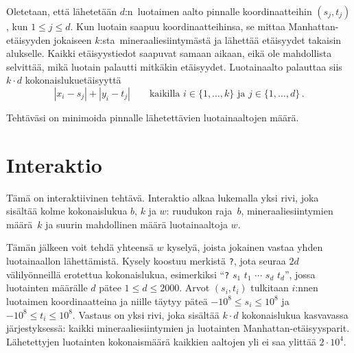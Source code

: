 Oletetaan, että lähetetään $d$:n~luotaimen aalto pinnalle koordinaatteihin $(s_j, t_j)$, kun $1\leq j\leq d$.
Kun luotain saapuu koordinaatteihinsa, se mittaa Manhattan-etäisyyden jokaiseen $k$:sta~mineraaliesiintymästä ja lähettää etäisyydet takaisin alukselle.
Kaikki etäisyystiedot saapuvat samaan aikaan, eikä ole mahdollista selvittää, mikä luotain palautti mitkäkin etäisyydet.
Luotainaalto palauttaa siis $k \cdot d$ kokonaislukuetäisyyttä
\[|x_i-s_j| + |y_i - t_j| \qquad\text{kaikilla } i \in \{1,\ldots,k\} \text{ ja } j \in\{ 1,\ldots,d\}\,.\]

Tehtäväsi on minimoida pinnalle lähetettävien luotainaaltojen määrä.

\section*{Interaktio}

Tämä on interaktiivinen tehtävä.
Interaktio alkaa lukemalla yksi rivi, joka sisältää kolme kokonaislukua $b$, $k$ ja $w$:
ruudukon raja~$b$,
mineraaliesiintymien määrä~$k$
ja suurin mahdollinen määrä luotainaaltoja $w$.

Tämän jälkeen voit tehdä yhteensä $w$ kyselyä, joista jokainen vastaa yhden luotainaallon lähettämistä.
Kysely koostuu merkistä \texttt{?}, jota seuraa $2d$ välilyönneillä erotettua kokonaislukua,
esimerkiksi ``\texttt{?} $s_1$ $t_1$ $\cdots$ $s_d$ $t_d$'',
jossa luotainten määrälle $d$ pätee
$1\leq d\leq 2000$. %
Arvot $(s_i,t_i)$ tulkitaan $i$:nnen luotaimen koordinaatteina ja niille täytyy päteä
$-10^8 \leq s_i \leq 10^8$ ja $-10^8 \leq t_i \leq 10^8$. %
Vastaus on yksi rivi, joka sisältää $k \cdot d$ kokonaislukua
kasvavassa järjestyksessä: %
kaikki mineraaliesiintymien ja luotainten Manhattan-etäisyysparit.
Lähetettyjen luotainten kokonaismäärä kaikkien aaltojen yli ei saa ylittää
$2\cdot 10^4.$ %

